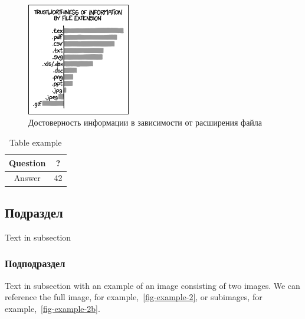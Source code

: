 \documentclass[intlimits,twoside,a4paper,11pt]{article}
\begin{document}
\begin{figure}[htb]
\centering
\includegraphics[width=0.4\textwidth]{xkcd1301.png}
\caption{Достоверность информации в зависимости от расширения файла} \label{fig-example}
\end{figure}

\begin{table}[H]
\centering
\caption{Table example}
\label{table-example}
\begin{tabular}{|c|c|}
	\hline
	Question & ? \\
	\hline
	Answer & 42 \\
	\hline
\end{tabular}
\end{table}

\subsection{Подраздел}
Text in subsection
\subsubsection{Подподраздел}
Text in subsection with an example of an image consisting of two images. We can reference the full image, for example,~\ref{fig-example-2}, or subimages, for example,~\ref{fig-example-2b}.
\end{document}
